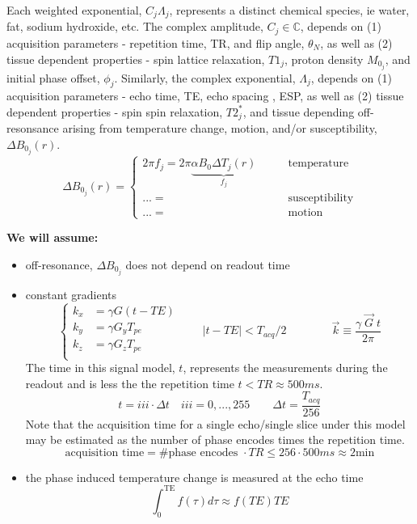 \documentclass[10pt]{amsart}
\begin{document}
Each weighted exponential, $C_j \Lambda_j$, represents a distinct chemical species,
ie water, fat, sodium hydroxide, etc. 
The complex amplitude,
$C_j \in \mathbb{C}$, 
depends on (1) acquisition parameters - repetition time, TR,
and flip angle, $\theta_N$, as well as (2) tissue dependent properties -
 spin lattice relaxation,  $T1_j$,
 proton density $M_{0_j}$, and
 initial phase offset, $\phi_j$.
Similarly, the complex exponential, $\Lambda_j$,
depends on (1) acquisition parameters - echo time, TE,
echo spacing , ESP, as well as (2) tissue dependent properties -
 spin spin relaxation,  $T2^*_j$, and tissue depending off-resonsance
arising from temperature change, motion, and/or susceptibility, 
$\Delta B_{0_j}(r)$.
\[
 \Delta B_{0_j}(r) = 
\left\{ 
\begin{split}
                2\pi f_j = 2\pi \underbrace{\alpha B_0 \Delta T_j(r)}_{f_j} & \qquad \text{temperature}   
\\
                ... =      & \qquad \text{susceptibility}   
\\
                ... =      & \qquad \text{motion}   
\end{split}
\right.
\]


\textbf{We will assume:} 
\begin{itemize} 
 \item off-resonance, $\Delta B_{0_j}$ does not depend on readout time
 \item constant gradients 
        \[ \left\{
             \begin{split}
           k_x & = \gamma G (t - TE) \\
           k_y & = \gamma  G_y T_{pe} \\
           k_z & = \gamma  G_z T_{pe} \\
           \end{split}
           \right. \qquad
          |t-TE| < T_{acq}/2
          \qquad \qquad
          \vec{k} \equiv \frac{\gamma \; \vec{G} \; t}{2 \pi}
        \]
The time in this signal model, $t$, represents the measurements during
the readout and is less the the repetition time $t < TR \approx 500ms$.
\[
  t =  iii \cdot \Delta t \quad iii = 0, ..., 255
\qquad 
  \Delta t = \frac{T_{acq}}{256} 
\]
Note that the acquisition time for a single echo/single slice under this model may be
estimated as the number of phase encodes times the repetition time.
\[
   \text{acquisition time} = \# \text{phase encodes } \cdot TR 
                           \leq 256 \cdot 500ms \approx 2 \text{min}
\]

 \item the phase induced temperature change is measured at the echo time
  \[
    \int_0^\text{TE} f(\tau) d\tau \approx f(TE) TE
  \]
\end{itemize} 
\end{document}
